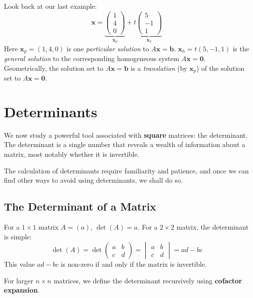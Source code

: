 \begin{remark}
Look back at our last example:
\[ \mathbf{x} = \underbrace{\begin{pmatrix} 1 \\ 4 \\ 0 \end{pmatrix}}_{\mathbf{x}_p} + t \underbrace{\begin{pmatrix} 5 \\ -1 \\ 1 \end{pmatrix}}_{\mathbf{x}_h} \]
Here $\mathbf{x}_p = (1, 4, 0)$ is one \emph{particular solution} to $A\mathbf{x} = \mathbf{b}$.
$\mathbf{x}_h = t(5, -1, 1)$ is the \emph{general solution} to the corresponding homogeneous system $A\mathbf{x} = \mathbf{0}$.
Geometrically, the solution set to $A\mathbf{x} = \mathbf{b}$ is a \emph{translation} (by $\mathbf{x}_p$) of the solution set to $A\mathbf{x} = \mathbf{0}$.
% 
\end{remark}

\section{Determinants}

We now study a powerful tool associated with \textbf{square} matrices: the determinant. The determinant is a single number that reveals a wealth of information about a matrix, most notably whether it is invertible.

The calculation of determinants require familiarity and patience, and once we can find other ways to avoid using determinants, we shall do so.

\subsection{The Determinant of a Matrix}

For a $1 \times 1$ matrix $A = (a)$, $\det(A) = a$.
For a $2 \times 2$ matrix, the determinant is simple:
\[ \det(A) = \det \begin{pmatrix} a & b \\ c & d \end{pmatrix} = \begin{vmatrix} a & b \\ c & d \end{vmatrix} = ad - bc \]
This value $ad-bc$ is non-zero if and only if the matrix is invertible.

For larger $n \times n$ matrices, we define the determinant recursively using \textbf{cofactor expansion}.

